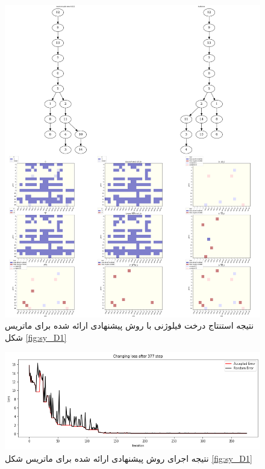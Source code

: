 \begin{figure}[!ht]
	\centering
	\includegraphics[height=0.85\textheight]{img/chaps/er/PM_s_tree}
	\caption{‌نتیجه استنتاج درخت فیلوژنی با روش پیشنهادی ارائه شده برای ماتریس شکل \ref*{fig:sy_D1}}
	\label{fig:sy_benchmark_pm}
\end{figure}

\begin{figure}[!ht]
\centering
\includegraphics[height=0.25\textheight]{img/chaps/er/PM_s_chart}
\caption{‌نتیجه اجرای روش پیشنهادی ارائه شده برای ماتریس شکل \ref*{fig:sy_D1}}
\label{fig:sy_benchmark_pm_chart}
\end{figure}


